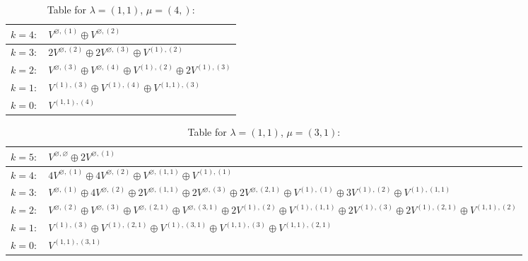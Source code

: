 \documentclass[a4paper,12pt]{article}
\begin{document}
\renewcommand{\arraystretch}{1.6} 
\begin{table}[H]
\centering
\caption{Table for $\lambda = (1, 1)$, $\mu = (4,)$:}
\begin{tabular}{|>{\centering\arraybackslash}p{15cm}|}
\hline
 $k = 4: \quad V^{\varnothing, (1)} \oplus V^{\varnothing, (2)} $ \\ \hline
 $k = 3: \quad 2 V^{\varnothing, (2)} \oplus 2 V^{\varnothing, (3)} \oplus V^{(1), (2)} $ \\ \hline
 $k = 2: \quad V^{\varnothing, (3)} \oplus V^{\varnothing, (4)} \oplus V^{(1), (2)} \oplus 2 V^{(1), (3)} $ \\ \hline
 $k = 1: \quad V^{(1), (3)} \oplus V^{(1), (4)} \oplus V^{(1, 1), (3)} $ \\ \hline
 $k = 0: \quad V^{(1, 1), (4)} $ \\ \hline
\end{tabular}
\end{table}

\renewcommand{\arraystretch}{1.6} 
\begin{table}[H]
\centering
\caption{Table for $\lambda = (1, 1)$, $\mu = (3, 1)$:}
\begin{tabular}{|>{\centering\arraybackslash}p{15cm}|}
\hline
 $k = 5: \quad V^{\varnothing, \varnothing} \oplus 2 V^{\varnothing, (1)} $ \\ \hline
 $k = 4: \quad 4 V^{\varnothing, (1)} \oplus 4 V^{\varnothing, (2)} \oplus V^{\varnothing, (1, 1)} \oplus V^{(1), (1)} $ \\ \hline
 $k = 3: \quad V^{\varnothing, (1)} \oplus 4 V^{\varnothing, (2)} \oplus 2 V^{\varnothing, (1, 1)} \oplus 2 V^{\varnothing, (3)} \oplus 2 V^{\varnothing, (2, 1)} \oplus V^{(1), (1)} \oplus 3 V^{(1), (2)} \oplus V^{(1), (1, 1)} $ \\ \hline
 $k = 2: \quad V^{\varnothing, (2)} \oplus V^{\varnothing, (3)} \oplus V^{\varnothing, (2, 1)} \oplus V^{\varnothing, (3, 1)} \oplus 2 V^{(1), (2)} \oplus V^{(1), (1, 1)} \oplus 2 V^{(1), (3)} \oplus 2 V^{(1), (2, 1)} \oplus V^{(1, 1), (2)} $ \\ \hline
 $k = 1: \quad V^{(1), (3)} \oplus V^{(1), (2, 1)} \oplus V^{(1), (3, 1)} \oplus V^{(1, 1), (3)} \oplus V^{(1, 1), (2, 1)} $ \\ \hline
 $k = 0: \quad V^{(1, 1), (3, 1)} $ \\ \hline
\end{tabular}
\end{table}
\end{document}
